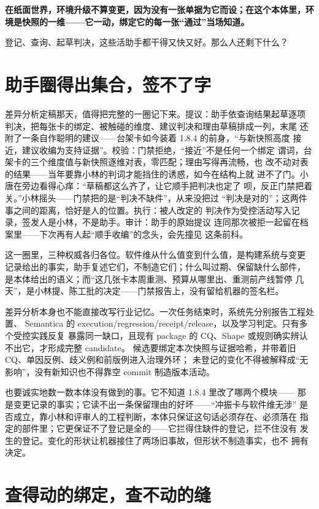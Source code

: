\textbf{在纸面世界，环境升级不算变更，因为没有一张单据为它而设；在这个本体里，环境是快照的一维——它一动，绑定它的每一张“通过”当场知道。}

登记、查询、起草判决，这些活助手都干得又快又好。那么人还剩下什么？

\section{助手圈得出集合，签不了字}

差异分析定稿那天，值得把完整的一圈记下来。提议：助手依查询结果起草逐项
判决，把每张卡的绑定、被触碰的维度、建议判决和理由草稿排成一列，末尾
还附了一条自作聪明的建议——台架卡如今装着 1.8.4 的前身，“与新快照高度
接近，建议收编为支持证据”。校验：门禁拒绝，“接近”不是任何一个绑定
谓词，台架卡的三个维度值与新快照逐维对表，零匹配；理由写得再流畅，也
改不动对表的结果——当年要靠小林的判词才能挡住的诱惑，如今在结构上就
进不了门。小唐在旁边看得心痒：“草稿都这么齐了，让它顺手把判决也定了
呗，反正门禁把着关。”小林摇头——门禁把的是“判决不缺件”，从来没把过
“判决是对的”；这两件事之间的距离，恰好是人的位置。执行：被人改定的
判决作为受控活动写入记录，签发人是小林，不是助手。审计：助手的原始提议
连同那次被拒一起留在档案里——下次再有人起“顺手收编”的念头，会先撞见
这条前科。

这一圈里，三种权威各归各位。软件维从什么值变到什么值，是构建系统与变更
记录给出的事实，助手复述它们，不制造它们；什么叫过期、保留缺什么部件，
是本体给出的语义；而“这几张卡本周重测、预算从哪里出、重测前产线暂停
几天”，是小林提、陈工批的决定——门禁报告上，没有留给机器的签名栏。

差异分析本身也不能直接改写行业记忆。一次任务结束时，系统先分别报告工程处置、
Semantica 的 execution/regression/receipt/release，以及学习判定。只有多个受控实践反复
暴露同一缺口，且现有 package 的 CQ、Shape 或规则确实辨认不出它，才形成完整 candidate。
候选要绑定本次快照与证据哈希，并带着旧 CQ、单因反例、歧义例和前版例进入治理外环；
未登记的变化不得被解释成“无影响”，没有新知识也不得靠空 commit 制造版本活动。

也要诚实地数一数本体没有做到的事。它不知道 1.8.4 里改了哪两个模块——
那是变更记录的事实；它读不出一条保留理由的好坏——“冲振卡与软件维无涉”
是否成立，靠小林和评审人的工程判断，本体只保证这句话必须存在、必须落在
指定的部件里；它更保证不了登记是全的——它拦得住缺件的登记，拦不住没有
发生的登记。变化的形状让机器接住了两场旧事故，但形状不制造事实，也不
拥有决定。

\section{查得动的绑定，查不动的缝}

